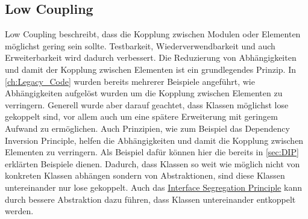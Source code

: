 \subsection{Low Coupling}
\label{sec:Low_Coupling}
Low Coupling beschreibt, dass die Kopplung zwischen Modulen oder Elementen möglichst gering sein sollte.
Testbarkeit, Wiederverwendbarkeit und auch Erweiterbarkeit wird dadurch verbessert.
Die Reduzierung von Abhängigkeiten und damit der Kopplung zwischen Elementen ist ein grundlegendes Prinzip.
In \ref{ch:Legacy_Code} wurden bereits mehrerer Beispiele angeführt, wie Abhängigkeiten aufgelöst wurden um die Kopplung zwischen Elementen zu verringern.
Generell wurde aber darauf geachtet, dass Klassen möglichst lose gekoppelt sind, vor allem auch um eine spätere Erweiterung mit geringem Aufwand zu ermöglichen.
Auch Prinzipien, wie zum Beispiel das Dependency Inversion Principle, helfen die Abhängigkeiten und damit die Kopplung zwischen Elementen zu verringern.
Als Beispiel dafür können hier die bereits in \ref{sec:DIP} erklärten Beispiele dienen.
Dadurch, dass Klassen so weit wie möglich nicht von konkreten Klassen abhängen sondern von Abstraktionen, sind diese Klassen untereinander nur lose gekoppelt.
Auch das \hyperref[sec:ISP]{Interface Segregation Principle} kann durch bessere Abstraktion dazu führen, dass Klassen untereinander entkoppelt werden.

